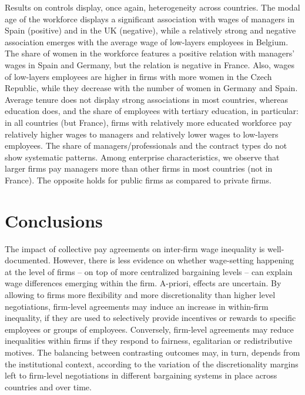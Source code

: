 \documentclass[12pt]{article}
\begin{document}
Results on controls display, once again, heterogeneity across
countries. The modal age of the workforce displays a significant
association with wages of managers in Spain (positive) and in the UK
(negative), while a relatively strong and negative association emerges
with the average wage of low-layers employees in Belgium. The share of
women in the workforce features a positive relation with managers'
wages in Spain and Germany, but the relation is negative in France.
Also, wages of low-layers employees are higher in firms with more
women in the Czech Republic, while they decrease with the number of
women in Germany and Spain. Average tenure does not display strong
associations in most countries, whereas education does, and the share
of employees with tertiary education, in particular: in all countries
(but France), firms with relatively more educated workforce pay
relatively higher wages to managers and relatively lower wages to
low-layers employees. The share of managers/professionals and the
contract types do not show systematic patterns. Among enterprise
characteristics, we observe that larger firms pay managers more than
other firms in most countries (not in France). The opposite holds for
public firms as compared to private firms.




\section{Conclusions}
\label{sec:conclusion}

The impact of collective pay agreements on inter-firm wage inequality
is well-documented. However, there is less evidence on whether
wage-setting happening at the level of firms -- on top of more
centralized bargaining levels -- can explain wage differences emerging
within the firm. A-priori, effects are uncertain. By allowing to firms
more flexibility and more discretionality than higher level
negotiations, firm-level agreements may induce an increase in
within-firm inequality, if they are used to selectively provide
incentives or rewards to specific employees or groups of employees.
Conversely, firm-level agreements may reduce inequalities within firms
if they respond to fairness, egalitarian or redistributive motives.
The balancing between contrasting outcomes may, in turn, depends from
the institutional context, according to the variation of the
discretionality margins left to firm-level negotiations in different
bargaining systems in place across countries and over time.\\
\end{document}
